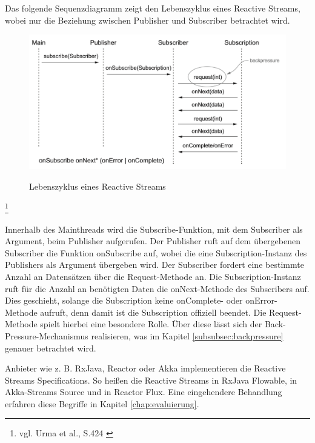 Das folgende Sequenzdiagramm zeigt den Lebenszyklus eines Reactive Streams, wobei nur die Beziehung zwischen Publisher und Subscriber betrachtet wird.
\begin{figure}[H]
    \caption{Lebenszyklus eines Reactive Streams}
    \includegraphics[width=\linewidth]{media/lifecycle}
    \label{lifecycle}
\end{figure} \footnote{vgl. Urma et al., S.424 \cite{buch:modern_java_in_action:kapitel17}}

Innerhalb des Mainthreads wird die Subscribe-Funktion, mit dem Subscriber als Argument, beim Publisher aufgerufen. Der Publisher ruft auf dem übergebenen Subscriber die Funktion onSubscribe auf, wobei die eine Subscription-Instanz des Publishers als Argument übergeben wird. Der Subscriber fordert eine bestimmte Anzahl an Datensätzen über die Request-Methode an. Die Subscription-Instanz ruft für die Anzahl an benötigten Daten die onNext-Methode des Subscribers auf. Dies geschieht, solange die Subscription keine onComplete- oder onError- Methode aufruft, denn damit ist die Subscription offiziell beendet. Die Request-Methode spielt hierbei eine besondere Rolle. Über diese lässt sich der Back-Pressure-Mechanismus realisieren, was im Kapitel \ref{subsubsec:backpressure} genauer betrachtet wird.

Anbieter wie z. B. RxJava, Reactor oder Akka implementieren die Reactive Streams Specifications.
So heißen die Reactive Streams in RxJava Flowable, in Akka-Streams Source und in Reactor Flux. Eine eingehendere Behandlung erfahren diese Begriffe in Kapitel \ref{chap:evaluierung}.
